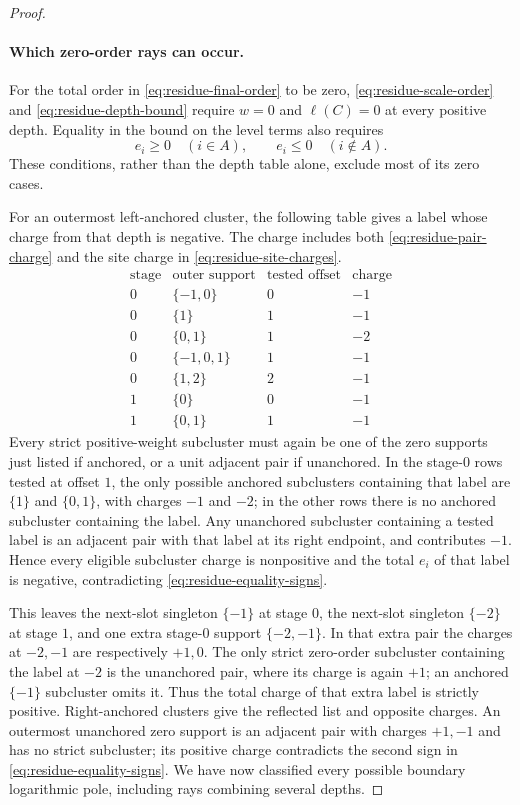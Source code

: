 \begin{proof}
\paragraph{Which zero-order rays can occur.}
For the total order in \eqref{eq:residue-final-order} to be zero,
\eqref{eq:residue-scale-order} and \eqref{eq:residue-depth-bound} require
$w=0$ and $\ell(C)=0$ at every positive depth. Equality in the bound
on the level terms also requires
\begin{equation}\label{eq:residue-equality-signs}
 e_i\ge0\quad(i\in A),\qquad e_i\le0\quad(i\notin A).
\end{equation}
These conditions, rather than the depth table alone, exclude most of its
zero cases.

For an outermost left-anchored cluster, the following table gives a label
whose charge from that depth is negative. The charge includes both
\eqref{eq:residue-pair-charge} and the site charge in
\eqref{eq:residue-site-charges}.
\[
\begin{array}{c|c|c|c}
\text{stage}&\text{outer support}&\text{tested offset}&\text{charge}\\ \hline
0&\{-1,0\}&0&-1\\
0&\{1\}&1&-1\\
0&\{0,1\}&1&-2\\
0&\{-1,0,1\}&1&-1\\
0&\{1,2\}&2&-1\\
1&\{0\}&0&-1\\
1&\{0,1\}&1&-1
\end{array}
\]
Every strict positive-weight subcluster must again be one of the zero supports
just listed if anchored, or a unit adjacent pair if unanchored. In the
stage-$0$ rows tested at offset $1$, the only possible anchored subclusters containing
that label are $\{1\}$ and $\{0,1\}$, with charges $-1$ and $-2$;
in the other rows there is no anchored subcluster containing the
label. Any unanchored subcluster containing a tested label is an adjacent pair
with that label at its right endpoint, and contributes $-1$. Hence every
eligible subcluster charge is nonpositive and the total $e_i$ of that label is negative,
contradicting \eqref{eq:residue-equality-signs}.

This leaves the next-slot singleton $\{-1\}$ at stage $0$, the next-slot
singleton $\{-2\}$ at stage $1$, and one extra stage-$0$ support
$\{-2,-1\}$. In that extra pair the charges at $-2,-1$ are respectively
$+1,0$. The only strict zero-order subcluster containing the label at $-2$
is the unanchored pair, where its charge is again $+1$; an anchored
$\{-1\}$ subcluster omits it. Thus the total charge of that extra label is
strictly positive. Right-anchored clusters give the reflected list and
opposite charges. An outermost unanchored zero support is an adjacent
pair with charges $+1,-1$ and has no strict subcluster; its positive
charge contradicts the second sign in
\eqref{eq:residue-equality-signs}. We have now classified every possible
boundary logarithmic pole, including rays combining several depths.


\end{proof}
